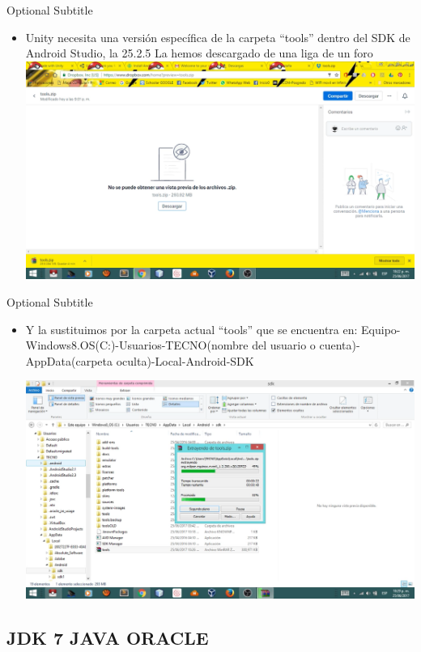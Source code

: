 \documentclass{beamer}
\begin{document}
\begin{frame}{19}{Optional Subtitle}
  \begin{itemize}
  \item {
    Unity necesita una versión específica de la carpeta “tools” dentro del SDK de Android Studio, la 25.2.5
La hemos descargado de una liga de un foro
  }
  \includegraphics[width=\linewidth]{image/IU19}
  \end{itemize}
\end{frame}

\begin{frame}{20}{Optional Subtitle}
  \begin{itemize}
  \item {
   Y la sustituimos por la carpeta actual “tools” que se encuentra en:
	Equipo-Windows8.OS(C:)-Usuarios-TECNO(nombre del usuario o cuenta)-AppData(carpeta oculta)-Local-Android-SDK
  }
  
  \includegraphics[width=\linewidth]{image/IU20}
  \end{itemize}
\end{frame}

\subsection{JDK 7 JAVA ORACLE}
\end{document}
